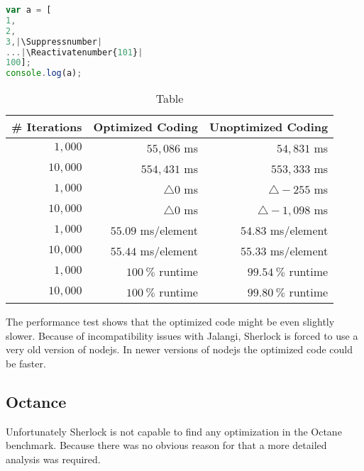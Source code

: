 \begin{lstlisting}[caption=Optimized test coding,label=list:opt_js_test,language=JavaScript]
var a = [
1,
2,
3,|\Suppressnumber|
...|\Reactivatenumber{101}|
100];
console.log(a);
\end{lstlisting}

\begin{table}
\begin{center}
\newcommand*{\thead}[1]{\multicolumn{1}{c}{\bfseries #1}}
\renewcommand{\arraystretch}{1.3}
\begin{tabular}[htbp]{r|r|r}
\thead{\# Iterations} & \thead{Optimized Coding} & \thead{Unoptimized Coding} \\
\hline $1,000$ & $55,086$ ms & $54,831$ ms \\
\hline $10,000$ & $554,431$ ms & $553,333$ ms \\
\hline\hline $1,000$ & $\bigtriangleup 0$ ms & $\bigtriangleup - 255$ ms \\
\hline $10,000$ & $\bigtriangleup 0$ ms & $\bigtriangleup - 1,098$ ms \\

\hline\hline $1,000$ & $55.09$ ms/element & $54.83$ ms/element \\
\hline $10,000$ & $55.44$ ms/element & $55.33$ ms/element  \\
\hline\hline $1,000$ & $100\ \%$ runtime & $99.54\ \%$ runtime \\
\hline $10,000$ & $100\ \%$ runtime & $99.80\ \%$ runtime \\ \hline
\end{tabular}
\end{center}
\caption{Table}\label{tab:perf_results}
\end{table}

The performance test shows that the optimized code might be even slightly slower. Because of incompatibility issues with Jalangi, Sherlock is forced to use a very old version of nodejs. In newer versions of nodejs the optimized code could be faster.



\subsection{Octance}

Unfortunately Sherlock is not capable to find any optimization in the Octane benchmark. Because there was no obvious reason for that a more detailed analysis was required.

